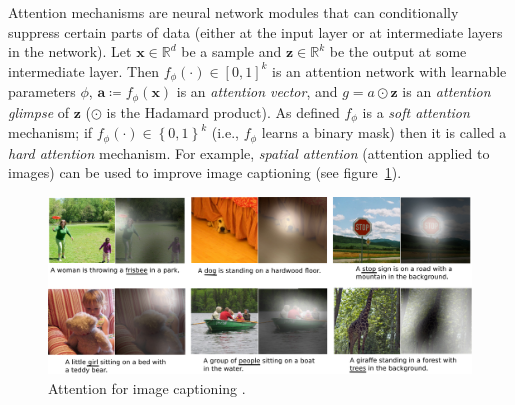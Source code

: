 Attention mechanisms \cite{bahdanau2014neural} are neural network modules that can conditionally suppress certain parts of data (either at the input layer or at intermediate layers in the network).
%
Let \(\bm{x} \in \mathbb{R}^d\) be a sample and \(\bm{z} \in \mathbb{R}^k\) be the output at some intermediate layer.
%
Then \(f_\phi(\cdot) \in \left[0,1\right]^k\) is an attention network with learnable parameters \(\phi\), \(\bm{a} \coloneqq f_\phi (\bm{x})\) is an \textit{attention vector}, and \(g = a \odot \bm{z}\) is an \textit{attention glimpse} of \(\bm{z}\) (\(\odot\) is the Hadamard product).
%
As defined \(f_\phi\) is a \textit{soft attention} mechanism; if \(f_\phi(\cdot) \in \left\{0,1\right\}^k\) (i.e., \(f_\phi\) learns a binary mask) then it is called a \textit{hard attention} mechanism.
%
For example, \textit{spatial attention} (attention applied to images) can be used to improve image captioning (see figure~\ref{fig:attention}).
\begin{figure}[!htbp]
    \centering
    \includegraphics[width=\textwidth]{figures/neural_networks/attention.png}
    \caption[]{Attention for image captioning \cite{xu2015attend}.}\label{fig:attention}
\end{figure}

